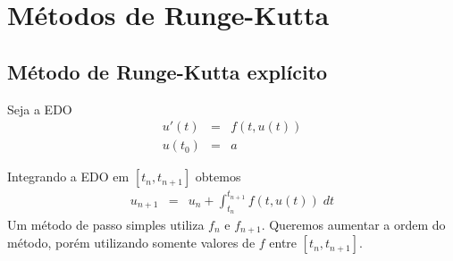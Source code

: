 %
%
%
%
%
%
%




\section{Métodos de Runge-Kutta}

\subsection{Método de Runge-Kutta explícito}
Seja a EDO
\begin{eqnarray}
  u'(t) &=&f(t,u(t)) \\
  u(t_0) &=&a
\end{eqnarray}

Integrando a EDO em $[t_n,t_{n+1}]$ obtemos
\begin{eqnarray}
  u_{n+1}  &=&u_n  + \int _{t_n}^{t_{n+1}} f(t,u(t)) \; dt
\end{eqnarray}
Um método de passo simples utiliza $f_n$ e $f_{n+1}$. Queremos aumentar a ordem do método, porém utilizando somente valores de $f$ entre $[t_n,t_{n+1}]$.

